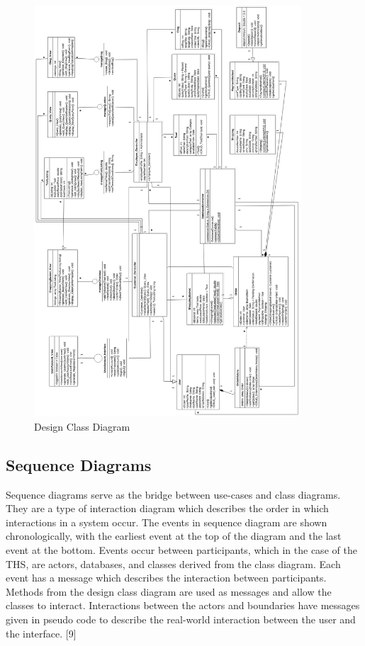 \documentclass[fontsize=11pt]{extarticle}
\numberwithin{figure}{section} %
\numberwithin{table}{section}%
\begin{document}
\begin{figure}[H]
      \centering
      \includegraphics[trim = 0 0 0 0, clip, width=0.89\textwidth]{TempImg/Dclass.png}
      \caption{Design Class Diagram}
 \end{figure}

\hypertarget{sequence-diagrams}{%
\subsection{Sequence Diagrams}\label{sequence-diagrams}}

Sequence diagrams serve as the bridge between use-cases and class
diagrams. They are a type of interaction diagram which describes the
order in which interactions in a system occur. The events in sequence
diagram are shown chronologically, with the earliest event at the top of
the diagram and the last event at the bottom. Events occur between
participants, which in the case of the THS, are actors, databases, and
classes derived from the class diagram. Each event has a message which
describes the interaction between participants. Methods from the design
class diagram are used as messages and allow the classes to interact.
Interactions between the actors and boundaries have messages given in
pseudo code to describe the real-world interaction between the user and
the interface. {[}9{]}
\end{document}
